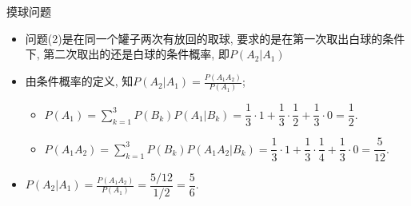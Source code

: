 \documentclass[Prob-All.tex]{subfiles}
\begin{document}
\begin{frame}{摸球问题}
	\begin{itemize}[<+-|alert@+>]
	\item 问题(2)是在同一个罐子两次有放回的取球, 要求的是在第一次取出白球的条件下, 第二次取出的还是白球的条件概率, 即$P(A_2|A_1)$
	\item 由条件概率的定义, 知\pause $P(A_2|A_1)=\frac{P(A_1A_2)}{P(A_1)}$;\pause %
	\begin{itemize}[<+-|alert@+>]
		\item $P(A_1)=\sum\limits_{k=1}^{3}P(B_k)P(A_1|B_k)=\dfrac{1}{3}·1+\dfrac{1}{3}·\dfrac{1}{2}+\dfrac{1}{3}·0=\dfrac{1}{2}.$
		\item $P(A_1A_2)=\sum\limits_{k=1}^{3}P(B_k)P(A_1A_2|B_k)=\dfrac{1}{3}·1+\dfrac{1}{3}·\dfrac{1}{4}+\dfrac{1}{3}·0=\dfrac{5}{12}.$
	\end{itemize}
	\item 	$P(A_2|A_1)=\frac{P(A_1A_2)}{P(A_1)}=\dfrac{5/12}{1/2}=\dfrac{5}{6}.$
\end{itemize}
\end{frame}
\end{document}
